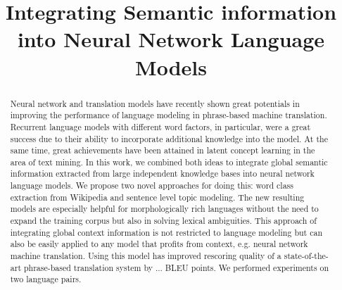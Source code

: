 \documentclass[a4paper]{article}
\title{Integrating Semantic information into Neural Network Language Models}
\begin{document}
\maketitle
%
\begin{abstract}
Neural network and translation models have recently shown great potentials in improving the performance of language modeling in phrase-based machine translation. Recurrent language models with different word factors, in particular, were a great success due to their ability to incorporate additional knowledge into the model. At the same time, great achievements have been attained in latent concept learning in the area of text mining. In this work, we combined both ideas to integrate global semantic information extracted from large independent knowledge bases into neural network language models. We propose two novel approaches for doing this: word class extraction from Wikipedia and sentence level topic modeling. 
The new resulting models are especially helpful for morphologically rich languages without the need to expand the training corpus but also in solving lexical ambiguities. This approach of integrating global context information is not restricted to language modeling but can also be easily applied to any model that profits from context, e.g. neural network machine translation. Using this model has improved rescoring quality of a state-of-the-art phrase-based translation system by ... BLEU points.  We performed experiments on two language pairs.



\end{abstract}


%
\end{document}
